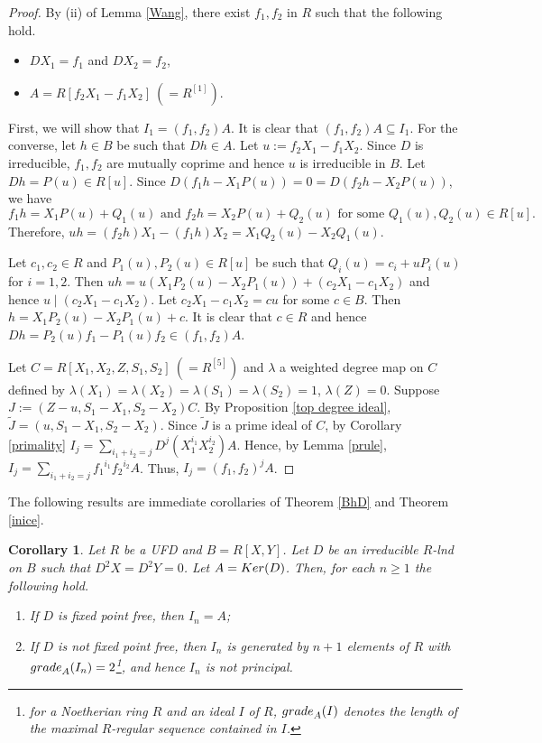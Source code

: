 \documentclass[a4paper,12pt]{article}
\newtheorem{cor}[thm]{Corollary}
\begin{document}
{\begin{proof}  By (ii) of Lemma \ref{Wang}, there exist $f_1,f_2$ in $R$ such that the following hold.
\begin{itemize}
	\item $DX_1=f_1$ and $DX_2=f_2$,
	\item $A=R[f_2X_1-f_1X_2]~(=R^{[1]})$.
\end{itemize}

\smallskip\noindent
First, we will show that $I_1=(f_1,f_2)A$. It is clear that $(f_1,f_2)A\subseteq I_1.$ For the converse, let $h\in B$ be such that $Dh\in A$. Let $u:=f_2X_1-f_1X_2$. Since $D$ is irreducible, $f_1,f_2$ are mutually coprime and hence $u$ is irreducible in $B$. Let $Dh=P(u)\in R[u]$. Since $D(f_1h-X_1P(u))=0=D(f_2h-X_2P(u))$, we have $$f_1h=X_1P(u)+Q_1(u) \text{ and } f_2h=X_2P(u)+Q_2(u) \text{ for some }Q_1(u),Q_2(u)\in R[u].$$ Therefore, $uh=(f_2h)X_1-(f_1h)X_2=X_1Q_2(u)-X_2Q_1(u)$.

\smallskip\noindent
Let $c_1,c_2\in R$ and $P_1(u),P_2(u)\in R[u]$ be such that $Q_i(u)=c_i+uP_i(u)$ for $i=1,2.$ Then $uh=u(X_1P_2(u)-X_2P_1(u))+(c_2X_1-c_1X_2)$ and hence $u\mid(c_2X_1-c_1X_2)$. 
Let $c_2X_1-c_1X_2=cu$ for some $c\in B$. Then $h=X_1P_2(u)-X_2P_1(u)+c$. It is clear that $c\in R$ and hence $Dh=P_2(u)f_1-P_1(u)f_2\in(f_1,f_2)A$.

\medskip\noindent
Let $C=R[X_1,X_2,Z,S_1,S_2]~(=R^{[5]})$ and $\lambda$ a weighted degree map on $C$ defined by $\lambda(X_1)=\lambda(X_2)=\lambda(S_1)=\lambda(S_2)=1$, $\lambda(Z)=0$. Suppose $J:=(Z-u,S_1-X_1,S_2-X_2)C$. By Proposition \ref{top degree ideal}, $\widetilde{J}=(u,S_1-X_1,S_2-X_2)$. Since $\widetilde{J}$ is a prime ideal of $C$, by Corollary \ref{primality}
$I_j=\underset{i_1+i_2=j}\sum D ^j(X_1^{i_1}X_2^{i_2})A$. Hence, by Lemma \ref{prule}, $I_j=\underset{i_1+i_2=j}\sum {f_1}^{i_1}{f_2}^{i_2}A$. Thus, $I_j={(f_1,f_2)}^{j}A$.
\end{proof}  

\smallskip
\noindent
The following results are immediate corollaries of Theorem \ref{BhD} and Theorem \ref{inice}.

\begin{cor}\label{ufd2}
Let $R$ be a {\rm UFD} and $B=R[X,Y]$. Let $D$ be an irreducible $R$-lnd on $B$ such that $D^2X=D^2Y=0$. Let $A={\rm Ker}(D)$. Then, for each $n \geq 1 $ the following hold.
\begin{enumerate}
	\item [\rm(i)]If $D$ is fixed point free, then $I_n=A$;
	\item [\rm(ii)] If $D$ is not fixed point free, then $I_n$ is generated by $n+1$ elements of $R$ with ${\rm grade}_A(I_n)=2${\small{\small \footnote{for a Noetherian ring $R$ and an ideal $I$ of $R$,  ${\rm grade}_A(I)$ denotes the length of the maximal $R$-regular sequence contained in $I$.}}}, and hence $I_n$ is not principal. 
\end{enumerate}
\end{cor}

}
\end{document}
